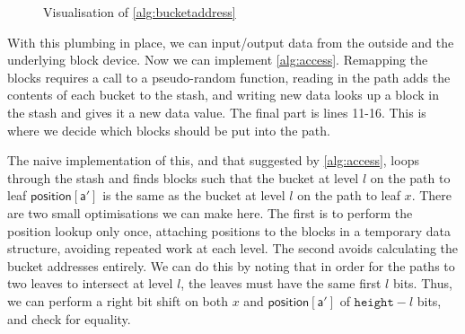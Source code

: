 \documentclass[12pt,a4paper,twoside,openright]{report}
\begin{document}
\begin{figure}[t]
    \centering
  \caption{Visualisation of \cref{alg:bucketaddress}}
  \label{fig:bucketaddress}
\end{figure}

With this plumbing in place, we can input/output data from the outside and the underlying block device. Now we can implement \cref{alg:access}. Remapping the blocks requires a call to a pseudo-random function, reading in the path adds the contents of each bucket to the stash, and writing new data looks up a block in the stash and gives it a new data value. The final part is lines 11-16. This is where we decide which blocks should be put into the path.

The naive implementation of this, and that suggested by \cref{alg:access}, loops through the stash and finds blocks such that the bucket at level $l$ on the path to leaf $\mathsf{position[a']}$ is the same as the bucket at level $l$ on the path to leaf $x$. There are two small optimisations we can make here. The first is to perform the position lookup only once, attaching positions to the blocks in a temporary data structure, avoiding repeated work at each level. The second avoids calculating the bucket addresses entirely. We can do this by noting that in order for the paths to two leaves to intersect at level $l$, the leaves must have the same first $l$ bits. Thus, we can perform a right bit shift on both $x$ and $\mathsf{position[a']}$ of $\mathtt{height} - l$ bits, and check for equality.
\end{document}
